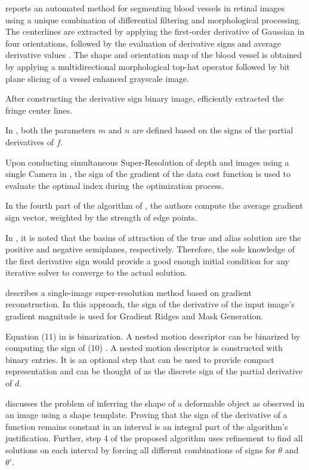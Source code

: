 \documentclass[11pt]{book}
\begin{document}
\cite{fraz2011retinal} reports an automated method for segmenting
blood vessels in retinal images using a unique combination of differential
filtering and morphological processing. The centerlines are extracted
by applying the first-order derivative of Gaussian in four orientations,
followed by the evaluation of derivative signs and average derivative
values . The shape and orientation map of the blood vessel is obtained
by applying a multidirectional morphological top-hat operator followed
by bit plane slicing of a vessel enhanced grayscale image.

After constructing the derivative sign binary image, \cite{el2012new}
efficiently extracted the fringe center lines.

In \cite{trujillo2013accurate}, both the parameters $m$ and $n$
are defined based on the signs of the partial derivatives of $f$.

Upon conducting simultaneous Super-Resolution of depth and images
using a single Camera in \cite{seok2013simultaneous}, the sign of
the gradient of the data cost function is used to evaluate the optimal
index during the optimization process.

In the fourth part of the algorithm of \cite{mccloskey2014improved},
the authors compute the average gradient sign vector, weighted by
the strength of edge points.

In \cite{tani2014derivative}, it is noted that the basins of attraction
of the true and alias solution are the positive and negative semiplanes,
respectively. Therefore, the sole knowledge of the first derivative
sign would provide a good enough initial condition for any iterative
solver to converge to the actual solution.

\cite{zhu2015modeling} describes a single-image super-resolution
method based on gradient reconstruction. In this approach, the sign
of the derivative of the input image's gradient magnitude is used
for Gradient Ridges and Mask Generation.

Equation (11) in \cite{byrne2015nested} is binarization. A nested
motion descriptor can be binarized by computing the sign of (10) .
A nested motion descriptor is constructed with binary entries. It
is an optional step that can be used to provide compact representation
and can be thought of as the discrete sign of the partial derivative
of $d$.

\cite{gallardo2015shape} discusses the problem of inferring the shape
of a deformable object as observed in an image using a shape template.
Proving that the sign of the derivative of a function remains constant
in an interval is an integral part of the algorithm's justification.
Further, step 4 of the proposed algorithm uses refinement to find
all solutions on each interval by forcing all different combinations
of signs for $\theta$ and $\theta'$.
\end{document}
